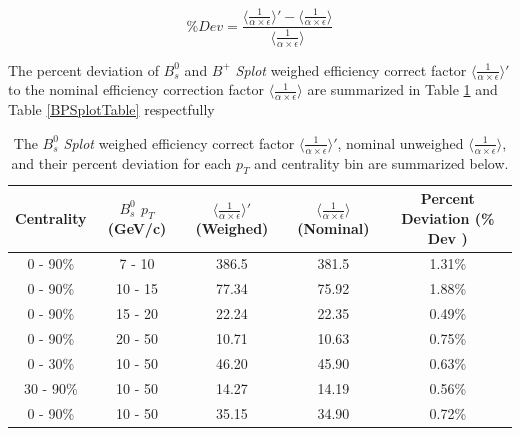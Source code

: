 \begin{equation}
\% Dev = \frac{\langle \frac{1}{\alpha \times \epsilon} \rangle' - \langle \frac{1}{\alpha \times \epsilon} \rangle}{\langle \frac{1}{\alpha \times \epsilon} \rangle}
\end{equation}


The percent deviation of $B^0_s$ and $B^+$ \textit{Splot} weighed efficiency correct factor $\langle \frac{1}{\alpha \times \epsilon}\rangle'$ to the nominal efficiency correction factor $\langle \frac{1}{\alpha \times \epsilon}\rangle$ are summarized in Table \ref{BsSplotTable} and Table \ref{BPSplotTable} respectfully  



\begin{table}[h]
\begin{center}
\caption{The $B^0_s$ \textit{Splot} weighed efficiency correct factor $\langle \frac{1}{\alpha \times \epsilon}\rangle'$, nominal unweighed $\langle \frac{1}{\alpha \times \epsilon} \rangle$, and their percent deviation for each $p_T$ and centrality bin are summarized below.}
\vspace{1em}
\label{BsSplotTable}
  \begin{tabular}{| c | c |c |c | c|}
    \hline
     Centrality & $B^0_s$  $p_T$ (GeV/c) & $\langle \frac{1}{\alpha \times \epsilon} \rangle'$ (Weighed) & $\langle \frac{1}{\alpha \times \epsilon} \rangle$ (Nominal)  & Percent Deviation (\% Dev ) \\
    \hline
    \hline
0 - 90\% & 7 - 10   &  386.5  & 381.5 & 1.31\% \\ 
0 - 90\% & 10 - 15 &   77.34 & 75.92 & 1.88\%  \\ 
0 - 90\% & 15 - 20 &  22.24  &  22.35 & 0.49\% \\ 
0 - 90\% & 20 - 50 &   10.71 & 10.63 & 0.75\%  \\ 
0 - 30\% & 10 - 50 &  46.20  &45.90 & 0.63\%  \\ 
30 - 90\% & 10 - 50 &  14.27 &14.19 & 0.56\% \\ 
0 - 90\% & 10 - 50 &   35.15  & 34.90 &  0.72\% \\ 
    \hline
    \hline
\end{tabular}
\end{center}
\end{table}

